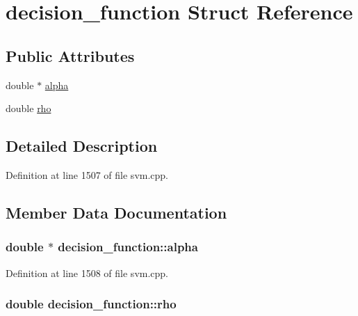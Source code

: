 \hypertarget{structdecision__function}{\section{decision\-\_\-function Struct Reference}
\label{structdecision__function}
}
\subsection*{Public Attributes}
\begin{DoxyCompactItemize}
\item 
double $\ast$ \hyperlink{structdecision__function_aa91175ec78c8d5e31763a65d9b23e5cd}{alpha}
\item 
double \hyperlink{structdecision__function_ae2aeeaa508803351b22d4454b81cb375}{rho}
\end{DoxyCompactItemize}


\subsection{Detailed Description}


Definition at line 1507 of file svm.\-cpp.



\subsection{Member Data Documentation}
\hypertarget{structdecision__function_aa91175ec78c8d5e31763a65d9b23e5cd}{
\subsubsection[{alpha}]{\setlength{\rightskip}{0pt plus 5cm}double $\ast$ decision\-\_\-function\-::alpha}}\label{structdecision__function_aa91175ec78c8d5e31763a65d9b23e5cd}


Definition at line 1508 of file svm.\-cpp.

\hypertarget{structdecision__function_ae2aeeaa508803351b22d4454b81cb375}{
\subsubsection[{rho}]{\setlength{\rightskip}{0pt plus 5cm}double decision\-\_\-function\-::rho}}\label{structdecision__function_ae2aeeaa508803351b22d4454b81cb375}


